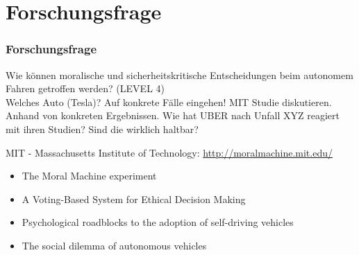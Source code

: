 \section{Forschungsfrage}

\begin{frame}
    \frametitle{Forschungsfrage}

    Wie können moralische und sicherheitskritische Entscheidungen beim autonomem Fahren getroffen werden? (LEVEL 4) \\
Welches Auto (Tesla)?  Auf konkrete Fälle eingehen! MIT Studie diskutieren. Anhand von konkreten Ergebnissen. Wie hat UBER nach Unfall XYZ reagiert mit ihren Studien? Sind die wirklich haltbar?
    \\ \pause

    MIT - Massachusetts Institute of Technology: \url{http://moralmachine.mit.edu/} \\ \pause

    \begin{itemize}
        \item The Moral Machine experiment \cite{Awad2018}
        \item A Voting-Based System for Ethical Decision Making \cite{DBLP:journals/corr/abs-1709-06692}
        \item Psychological roadblocks to the adoption of self-driving vehicles \cite{Shariff2017}
        \item The social dilemma of autonomous vehicles \cite{Bonnefon1573}
    \end{itemize}
\end{frame}
